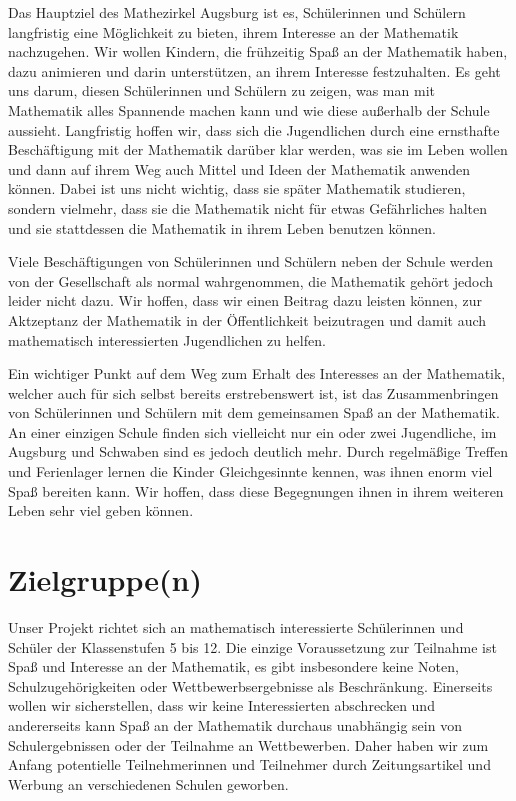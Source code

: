 \documentclass[12pt]{zettel}
\begin{document}
Das Hauptziel des Mathezirkel Augsburg ist es, Schülerinnen und Schülern
langfristig eine Möglichkeit zu bieten, ihrem Interesse an der
Mathematik nachzugehen. Wir wollen Kindern, die frühzeitig Spaß an der
Mathematik haben, dazu animieren und darin unterstützen, an ihrem
Interesse festzuhalten. Es geht uns darum, diesen Schülerinnen und
Schülern zu zeigen, was man mit Mathematik alles Spannende machen kann
und wie diese außerhalb der Schule aussieht. Langfristig hoffen wir,
dass sich die Jugendlichen durch eine ernsthafte Beschäftigung mit der
Mathematik darüber klar werden, was sie im Leben wollen und dann auf
ihrem Weg auch Mittel und Ideen der Mathematik anwenden können. Dabei
ist uns nicht wichtig, dass sie später Mathematik studieren, sondern
vielmehr, dass sie die Mathematik nicht für etwas Gefährliches halten
und sie stattdessen die Mathematik in ihrem Leben benutzen können.

Viele Beschäftigungen von Schülerinnen und Schülern neben der Schule
werden von der Gesellschaft als normal wahrgenommen, die Mathematik
gehört jedoch leider nicht dazu. Wir hoffen, dass wir einen Beitrag dazu
leisten können, zur Aktzeptanz der Mathematik in der Öffentlichkeit
beizutragen und damit auch mathematisch interessierten Jugendlichen zu
helfen.

Ein wichtiger Punkt auf dem Weg zum Erhalt des Interesses an der
Mathematik, welcher auch für sich selbst bereits erstrebenswert ist, ist
das Zusammenbringen von Schülerinnen und Schülern mit dem gemeinsamen
Spaß an der Mathematik. An einer einzigen Schule finden sich vielleicht
nur ein oder zwei Jugendliche, im Augsburg und Schwaben sind es jedoch
deutlich mehr. Durch regelmäßige Treffen und Ferienlager lernen die
Kinder Gleichgesinnte kennen, was ihnen enorm viel Spaß bereiten kann.
Wir hoffen, dass diese Begegnungen ihnen in ihrem weiteren Leben sehr
viel geben können.


\section{Zielgruppe(n)}

Unser Projekt richtet sich an mathematisch interessierte Schülerinnen
und Schüler der Klassenstufen 5 bis 12. Die einzige Voraussetzung zur
Teilnahme ist Spaß und Interesse an der Mathematik, es gibt insbesondere
keine Noten, Schulzugehörigkeiten oder Wettbewerbsergebnisse als
Beschränkung. Einerseits wollen wir sicherstellen, dass wir keine
Interessierten abschrecken und andererseits kann Spaß an der Mathematik
durchaus unabhängig sein von Schulergebnissen oder der Teilnahme an
Wettbewerben. Daher haben wir zum Anfang potentielle Teilnehmerinnen und
Teilnehmer durch Zeitungsartikel und Werbung an verschiedenen Schulen
geworben.
\end{document}
